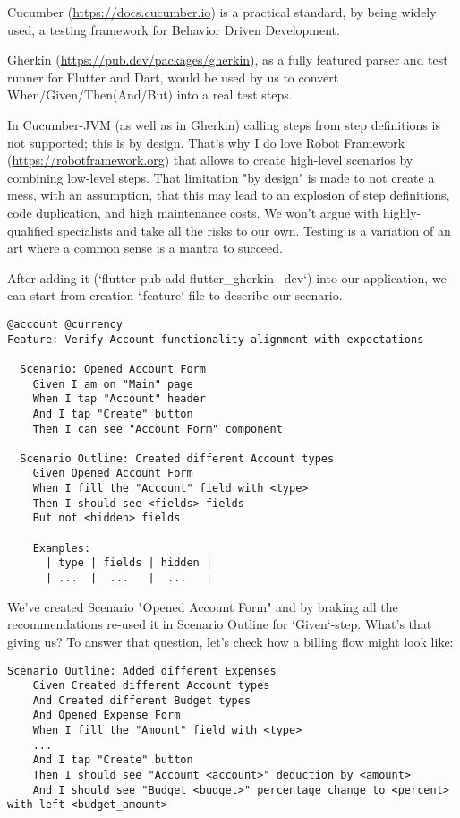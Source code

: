 Cucumber (\href{https://docs.cucumber.io}{https://docs.cucumber.io}) is a practical standard, by being widely used, 
a testing framework for Behavior Driven Development.

Gherkin (\href{https://pub.dev/packages/gherkin}{https://pub.dev/packages/gherkin}), as a fully featured parser and 
test runner for Flutter and Dart, would be used by us to convert When/Given/Then(And/But) into a real test steps.

In Cucumber-JVM (as well as in Gherkin) calling steps from step definitions is not supported; this is by design. That's
why I do love Robot Framework (\href{https://robotframework.org}{https://robotframework.org}) that allows to create 
high-level scenarios by combining low-level steps. That limitation "by design" is made to not create a mess, with an 
assumption, that this may lead to an explosion of step definitions, code duplication, and high maintenance costs. We 
won't argue with highly-qualified specialists and take all the risks to our own. Testing is a variation of an art where 
a common sense is a mantra to succeed.

After adding it (`flutter pub add flutter\_gherkin --dev`) into our application, we can start from creation 
`.feature`-file to describe our scenario.

\begin{lstlisting}[language=cucumber]
@account @currency
Feature: Verify Account functionality alignment with expectations

  Scenario: Opened Account Form
    Given I am on "Main" page
    When I tap "Account" header
    And I tap "Create" button
    Then I can see "Account Form" component

  Scenario Outline: Created different Account types
    Given Opened Account Form
    When I fill the "Account" field with <type>
    Then I should see <fields> fields
    But not <hidden> fields

    Examples: 
      | type | fields | hidden |
      | ...  |  ...   |  ...   |
\end{lstlisting}

We've created Scenario "Opened Account Form" and by braking all the recommendations re-used it in Scenario Outline 
for `Given`-step. What's that giving us? To answer that question, let's check how a billing flow might look like:

\begin{lstlisting}[language=cucumber]
  Scenario Outline: Added different Expenses
    Given Created different Account types
    And Created different Budget types
    And Opened Expense Form
    When I fill the "Amount" field with <type>
    ...
    And I tap "Create" button
    Then I should see "Account <account>" deduction by <amount>
    And I should see "Budget <budget>" percentage change to <percent> with left <budget_amount>
\end{lstlisting}

